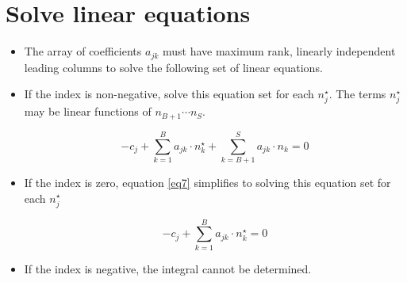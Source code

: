 \documentclass{article}
\begin{document}
\section{Solve linear equations}
\begin{itemize}
    \item The array of coefficients $a_{jk}$ must have maximum rank, linearly independent leading columns to solve the following set of linear equations.

    \item If the index is non-negative, solve this equation set for each $n_j^\star$. The terms $n_j^\star$ may be linear functions of ${n_{B+1}\cdots n_S}$.

    \begin{equation}
    \label{eq7}
    -c_j + \sum_{k=1}^B a_{jk} \cdot n_k^\star + \sum_{k=B+1}^S a_{jk}\cdot n_k = 0
    \end{equation}

    \item If the index is zero, equation \ref{eq7} simplifies to solving this equation set for each $n_j^\star$

    \begin{equation}
    \label{eq8}
    -c_j + \sum_{k=1}^B a_{jk}\cdot n_k^\star = 0
    \end{equation}

    \item If the index is negative, the integral cannot be determined.
\end{itemize}
\end{document}
